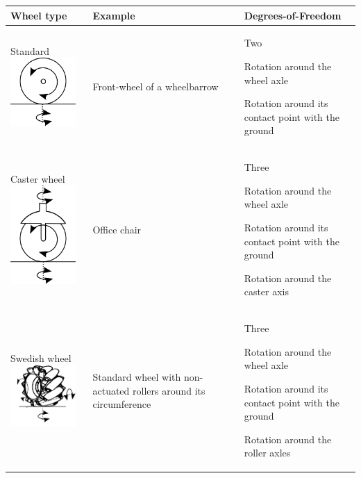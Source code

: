 \begin{table}
\begin{tabular}{p{2.8cm}p{3cm}p{4cm}}
\hline
Wheel type & Example & Degrees-of-Freedom\\
\hline
Standard \includegraphics[width=2.5cm]{figs/wheeltype_standard.png} &	Front-wheel of a wheelbarrow	& Two
\begin{compactitem}
\item Rotation around the wheel axle
\item Rotation around its contact point with the ground
\end{compactitem}\\
\hline
Caster wheel	\includegraphics[width=2.5cm]{figs/wheeltype_caster.png}& Office chair & Three
\begin{compactitem}
\item Rotation around the wheel axle
\item Rotation around its contact point with the ground
\item Rotation around the caster axis
\end{compactitem}\\
\hline
Swedish wheel \includegraphics[width=2.5cm]{figs/wheeltype_swedish.png}& Standard wheel with non-actuated rollers around its circumference& Three
\begin{compactitem}
\item Rotation around the wheel axle
\item Rotation around its contact point with the ground
\item Rotation around the roller axles

\end{compactitem}
\end{tabular}
\end{table}
